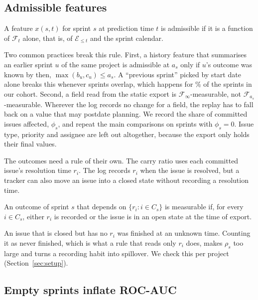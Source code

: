\subsection{Admissible features}

\begin{definition}
A feature $x(s, t)$ for sprint $s$ at prediction time $t$ is admissible if it is a function of $\mathcal{F}_t$ alone, that is, of $\mathcal{E}_{\le t}$ and the sprint calendar.
\end{definition}

Two common practices break this rule. First, a history feature that summarises an earlier sprint $u$ of the same project is admissible at $a_s$ only if $u$'s outcome was known by then, $\max(b_u, c_u) \le a_s$. A ``previous sprint'' picked by start date alone breaks this whenever sprints overlap, which happens for \OverlapShare\% of the sprints in our cohort. Second, a field read from the static export is $\mathcal{F}_\infty$-measurable, not $\mathcal{F}_{a_s}$-measurable. Wherever the log records no change for a field, the replay has to fall back on a value that may postdate planning. We record the share of committed issues affected, $\phi_s$, and repeat the main comparisons on sprints with $\phi_s = 0$. Issue type, priority and assignee are left out altogether, because the export only holds their final values.

The outcomes need a rule of their own. The carry ratio uses each committed issue's resolution time $r_i$. The log records $r_i$ when the issue is resolved, but a tracker can also move an issue into a closed state without recording a resolution time.

\begin{definition}
An outcome of sprint $s$ that depends on $\{r_i : i \in C_s\}$ is measurable if, for every $i \in C_s$, either $r_i$ is recorded or the issue is in an open state at the time of export.
\end{definition}

An issue that is closed but has no $r_i$ was finished at an unknown time. Counting it as never finished, which is what a rule that reads only $r_i$ does, makes $\rho_s$ too large and turns a recording habit into spillover. We check this per project (Section~\ref{sec:setup}).

\subsection{Empty sprints inflate ROC-AUC}


